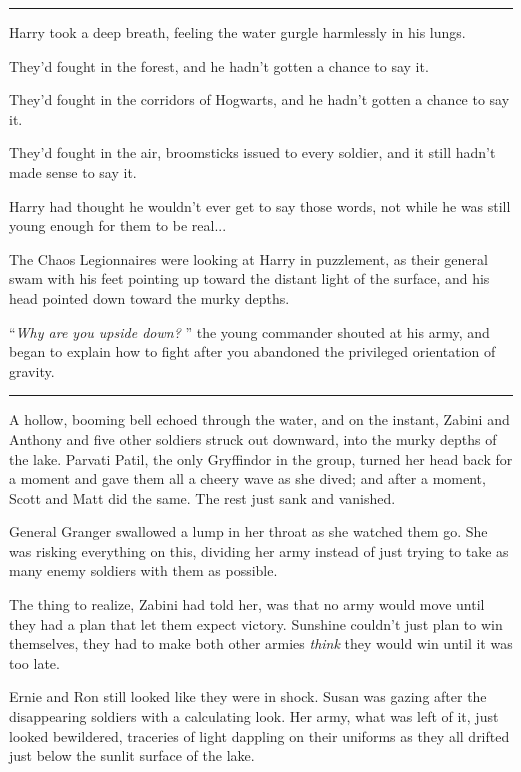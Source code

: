 \begin{center}\rule{3in}{0.4pt}\end{center}

Harry took a deep breath, feeling the water gurgle harmlessly in his
lungs.

They'd fought in the forest, and he hadn't gotten a chance to say it.

They'd fought in the corridors of Hogwarts, and he hadn't gotten a
chance to say it.

They'd fought in the air, broomsticks issued to every soldier, and it
still hadn't made sense to say it.

Harry had thought he wouldn't ever get to say those words, not while he
was still young enough for them to be real...

The Chaos Legionnaires were looking at Harry in puzzlement, as their
general swam with his feet pointing up toward the distant light of the
surface, and his head pointed down toward the murky depths.

``\emph{Why are you upside down?} '' the young commander shouted at his
army, and began to explain how to fight after you abandoned the
privileged orientation of gravity.

\begin{center}\rule{3in}{0.4pt}\end{center}

A hollow, booming bell echoed through the water, and on the instant,
Zabini and Anthony and five other soldiers struck out downward, into the
murky depths of the lake. Parvati Patil, the only Gryffindor in the
group, turned her head back for a moment and gave them all a cheery wave
as she dived; and after a moment, Scott and Matt did the same. The rest
just sank and vanished.

General Granger swallowed a lump in her throat as she watched them go.
She was risking everything on this, dividing her army instead of just
trying to take as many enemy soldiers with them as possible.

The thing to realize, Zabini had told her, was that no army would move
until they had a plan that let them expect victory. Sunshine couldn't
just plan to win themselves, they had to make both other armies
\emph{think} they would win until it was too late.

Ernie and Ron still looked like they were in shock. Susan was gazing
after the disappearing soldiers with a calculating look. Her army, what
was left of it, just looked bewildered, traceries of light dappling on
their uniforms as they all drifted just below the sunlit surface of the
lake.

